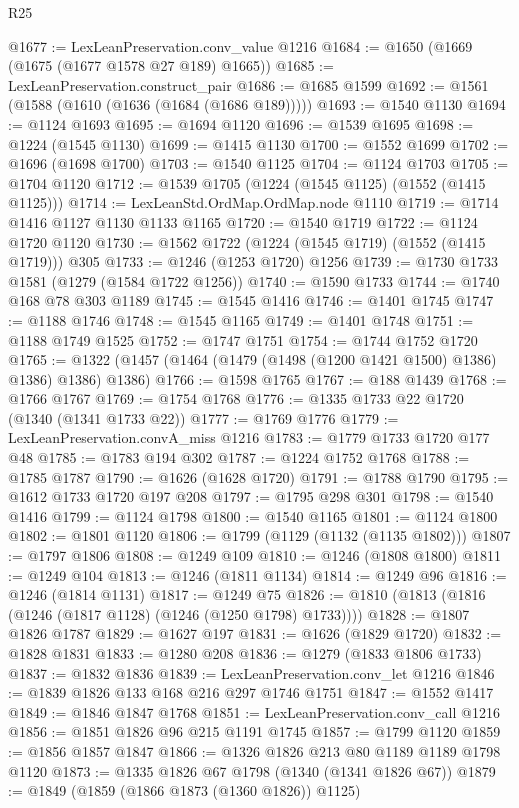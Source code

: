 \begin{lexlean}{R25}
\begin{coremodule}
@1677 := LexLeanPreservation.conv_value @1216
@1684 := @1650 (@1669 (@1675 (@1677 @1578 @27 @189) @1665))
@1685 := LexLeanPreservation.construct_pair
@1686 := @1685 @1599
@1692 := @1561 (@1588 (@1610 (@1636 (@1684 (@1686 @189)))))
@1693 := @1540 @1130
@1694 := @1124 @1693
@1695 := @1694 @1120
@1696 := @1539 @1695
@1698 := @1224 (@1545 @1130)
@1699 := @1415 @1130
@1700 := @1552 @1699
@1702 := @1696 (@1698 @1700)
@1703 := @1540 @1125
@1704 := @1124 @1703
@1705 := @1704 @1120
@1712 := @1539 @1705 (@1224 (@1545 @1125) (@1552 (@1415 @1125)))
@1714 := LexLeanStd.OrdMap.OrdMap.node @1110
@1719 := @1714 @1416 @1127 @1130 @1133 @1165
@1720 := @1540 @1719
@1722 := @1124 @1720 @1120
@1730 := @1562 @1722 (@1224 (@1545 @1719) (@1552 (@1415 @1719))) @305
@1733 := @1246 (@1253 @1720) @1256
@1739 := @1730 @1733 @1581 (@1279 (@1584 @1722 @1256))
@1740 := @1590 @1733
@1744 := @1740 @168 @78 @303 @1189
@1745 := @1545 @1416
@1746 := @1401 @1745
@1747 := @1188 @1746
@1748 := @1545 @1165
@1749 := @1401 @1748
@1751 := @1188 @1749 @1525
@1752 := @1747 @1751
@1754 := @1744 @1752 @1720
@1765 := @1322 (@1457 (@1464 (@1479 (@1498 (@1200 @1421 @1500) @1386) @1386) @1386) @1386)
@1766 := @1598 @1765
@1767 := @188 @1439
@1768 := @1766 @1767
@1769 := @1754 @1768
@1776 := @1335 @1733 @22 @1720 (@1340 (@1341 @1733 @22))
@1777 := @1769 @1776
@1779 := LexLeanPreservation.convA_miss @1216
@1783 := @1779 @1733 @1720 @177 @48
@1785 := @1783 @194 @302
@1787 := @1224 @1752 @1768
@1788 := @1785 @1787
@1790 := @1626 (@1628 @1720)
@1791 := @1788 @1790
@1795 := @1612 @1733 @1720 @197 @208
@1797 := @1795 @298 @301
@1798 := @1540 @1416
@1799 := @1124 @1798
@1800 := @1540 @1165
@1801 := @1124 @1800
@1802 := @1801 @1120
@1806 := @1799 (@1129 (@1132 (@1135 @1802)))
@1807 := @1797 @1806
@1808 := @1249 @109
@1810 := @1246 (@1808 @1800)
@1811 := @1249 @104
@1813 := @1246 (@1811 @1134)
@1814 := @1249 @96
@1816 := @1246 (@1814 @1131)
@1817 := @1249 @75
@1826 := @1810 (@1813 (@1816 (@1246 (@1817 @1128) (@1246 (@1250 @1798) @1733))))
@1828 := @1807 @1826 @1787
@1829 := @1627 @197
@1831 := @1626 (@1829 @1720)
@1832 := @1828 @1831
@1833 := @1280 @208
@1836 := @1279 (@1833 @1806 @1733)
@1837 := @1832 @1836
@1839 := LexLeanPreservation.conv_let @1216
@1846 := @1839 @1826 @133 @168 @216 @297 @1746 @1751
@1847 := @1552 @1417
@1849 := @1846 @1847 @1768
@1851 := LexLeanPreservation.conv_call @1216
@1856 := @1851 @1826 @96 @215 @1191 @1745
@1857 := @1799 @1120
@1859 := @1856 @1857 @1847
@1866 := @1326 @1826 @213 @80 @1189 @1189 @1798 @1120
@1873 := @1335 @1826 @67 @1798 (@1340 (@1341 @1826 @67))
@1879 := @1849 (@1859 (@1866 @1873 (@1360 @1826)) @1125)

\end{coremodule}
\end{lexlean}
